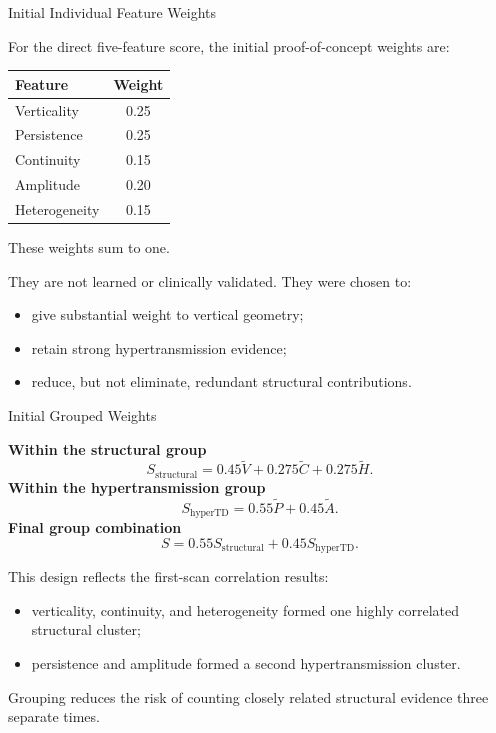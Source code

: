 \documentclass[aspectratio=169]{beamer}
\begin{document}
\begin{frame}{Initial Individual Feature Weights}

For the direct five-feature score, the initial proof-of-concept weights are:

\begin{table}
\centering
\begin{tabular}{lc}
\toprule
Feature & Weight \\
\midrule
Verticality & 0.25 \\
Persistence & 0.25 \\
Continuity & 0.15 \\
Amplitude & 0.20 \\
Heterogeneity & 0.15 \\
\bottomrule
\end{tabular}
\end{table}

These weights sum to one.

\vspace{0.3cm}

They are not learned or clinically validated. They were chosen to:

\begin{itemize}
    \item give substantial weight to vertical geometry;
    \item retain strong hypertransmission evidence;
    \item reduce, but not eliminate, redundant structural contributions.
\end{itemize}

\end{frame}

\begin{frame}{Initial Grouped Weights}

\textbf{Within the structural group}
\[
S_{\mathrm{structural}}
=
0.45\widetilde V
+
0.275\widetilde C
+
0.275\widetilde H.
\]
\textbf{Within the hypertransmission group}
\[
S_{\mathrm{hyperTD}}
=
0.55\widetilde P
+
0.45\widetilde A.
\]
\textbf{Final group combination}
\[
S
=
0.55S_{\mathrm{structural}}
+
0.45S_{\mathrm{hyperTD}}.
\]

\vspace{0.3cm}

This design reflects the first-scan correlation results:

\begin{itemize}
    \item verticality, continuity, and heterogeneity formed one highly
    correlated structural cluster;
    \item persistence and amplitude formed a second hypertransmission cluster.
\end{itemize}

Grouping reduces the risk of counting closely related structural evidence
three separate times.

\end{frame}
\end{document}
